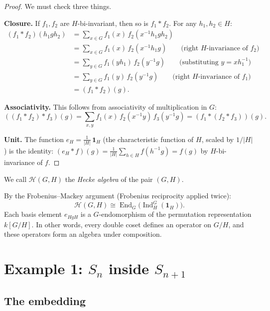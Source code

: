 \documentclass[12pt,a4paper]{article}
\theoremstyle{definition}
\theoremstyle{remark}
\newcommand{\End}{\operatorname{End}}
\newcommand{\Ind}{\operatorname{Ind}}
\newcommand{\Hecke}{\mathcal{H}}
\begin{document}
\begin{proof}
We must check three things.

\medskip\noindent\textbf{Closure.} If $f_1, f_2$ are
$H$-bi-invariant, then so is $f_1 * f_2$. For any $h_1, h_2 \in H$:
\begin{align*}
  (f_1 * f_2)(h_1 g h_2)
  &= \sum_{x \in G} f_1(x)\, f_2(x^{-1} h_1 g h_2) \\
  &= \sum_{x \in G} f_1(x)\, f_2(x^{-1} h_1 g)
    \qquad\text{(right $H$-invariance of $f_2$)} \\
  &= \sum_{y \in G} f_1(y h_1)\, f_2(y^{-1} g)
    \qquad\text{(substituting $y = xh_1^{-1}$)} \\
  &= \sum_{y \in G} f_1(y)\, f_2(y^{-1} g)
    \qquad\text{(right $H$-invariance of $f_1$)} \\
  &= (f_1 * f_2)(g).
\end{align*}

\medskip\noindent\textbf{Associativity.} This follows from
associativity of multiplication in $G$:
\[
  ((f_1 * f_2) * f_3)(g)
  = \sum_{x,y} f_1(x)\, f_2(x^{-1}y)\, f_3(y^{-1}g)
  = (f_1 * (f_2 * f_3))(g).
\]

\medskip\noindent\textbf{Unit.} The function
$e_H = \frac{1}{|H|}\, \mathbf{1}_H$ (the characteristic function
of $H$, scaled by $1/|H|$) is the identity:
$(e_H * f)(g) = \frac{1}{|H|} \sum_{h \in H} f(h^{-1}g)
= f(g)$
by $H$-bi-invariance of $f$.
\end{proof}

We call $\Hecke(G, H)$ the \emph{Hecke algebra} of the pair $(G, H)$.

By the Frobenius--Mackey argument (Frobenius reciprocity applied
twice):
\begin{equation}\label{eq:hecke-end}
  \Hecke(G, H) \cong \End_G\bigl(\Ind_H^G(\mathbf{1}_H)\bigr).
\end{equation}
Each basis element $e_{HgH}$ is a $G$-endomorphism of the permutation
representation $k[G/H]$. In other words, every double coset defines an
operator on $G/H$, and these operators form an algebra under
composition.

\section{Example 1: $S_n$ inside $S_{n+1}$}
\label{sec:Sn}

\subsection{The embedding}
\end{document}
